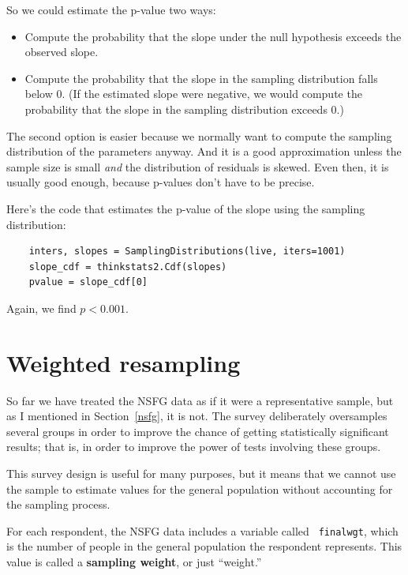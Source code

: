\documentclass[12pt]{book}
\begin{document}
So we could estimate the p-value two ways:

\begin{itemize}

\item Compute the probability that the slope under the null
hypothesis exceeds the observed slope.

\item Compute the probability that the slope in the sampling
distribution falls below 0.  (If the estimated slope were negative,
we would compute the probability that the slope in the sampling
distribution exceeds 0.)

\end{itemize}

The second option is easier because we normally want to compute the
sampling distribution of the parameters anyway.  And it is a good
approximation unless the sample size is small {\em and\/} the
distribution of residuals is skewed.  Even then, it is usually good
enough, because p-values don't have to be precise.

Here's the code that estimates the p-value of the slope using the
sampling distribution:

\begin{verbatim}
    inters, slopes = SamplingDistributions(live, iters=1001)
    slope_cdf = thinkstats2.Cdf(slopes)
    pvalue = slope_cdf[0]
\end{verbatim}

Again, we find $p < 0.001$.  


\section{Weighted resampling}
\label{weighted}

So far we have treated the NSFG data as if it were a representative
sample, but as I mentioned in Section~\ref{nsfg}, it is not.  The
survey deliberately oversamples several groups in order to
improve the chance of getting statistically significant results; that
is, in order to improve the power of tests involving these groups.
   

This survey design is useful for many purposes, but it means that we
cannot use the sample to estimate values for the general
population without accounting for the sampling process.

For each respondent, the NSFG data includes a variable called {\tt
  finalwgt}, which is the number of people in the general population
the respondent represents.  This value is called a {\bf sampling
  weight}, or just ``weight.''
\end{document}
